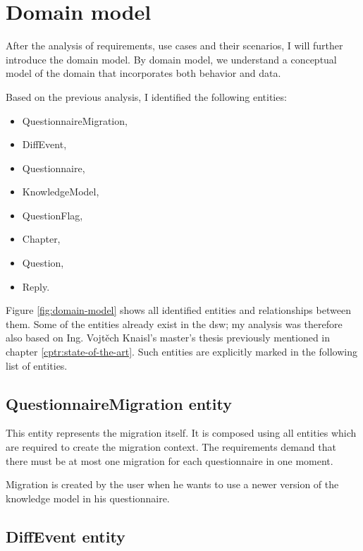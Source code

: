 \section{Domain model}\label{sec:domain-model}

After the analysis of requirements, use cases and their scenarios, I will further introduce the domain model.
By domain model, we understand a conceptual model of the domain that incorporates both behavior and data\cite{wiki-domain-model}.

Based on the previous analysis, I identified the following entities:

\begin{itemize}
    \item QuestionnaireMigration,
    \item DiffEvent,
    \item Questionnaire,
    \item KnowledgeModel,
    \item QuestionFlag,
    \item Chapter,
    \item Question,
    \item Reply.
\end{itemize}

Figure \ref{fig:domain-model} shows all identified entities and relationships between them.
Some of the entities already exist in the \gls{dsw}; my analysis was therefore also based on Ing. Vojtěch Knaisl's master's thesis\cite{mt-knaisl} previously mentioned in chapter \ref{cptr:state-of-the-art}.
Such entities are explicitly marked in the following list of entities.


\subsection{QuestionnaireMigration entity}

This entity represents the migration itself.
It is composed using all entities which are required to create the migration context.
The requirements demand that there must be at most one migration for each questionnaire in one moment.

Migration is created by the user when he wants to use a newer version of the knowledge model in his questionnaire.

\subsection{DiffEvent entity}

